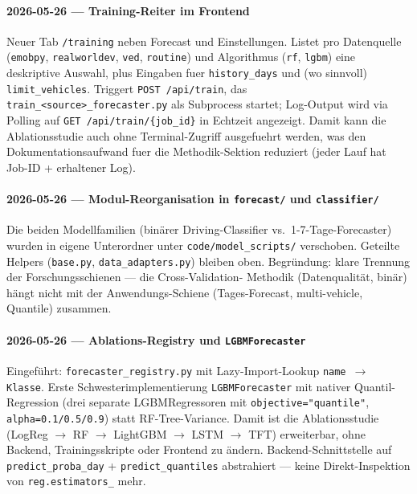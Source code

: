 \paragraph{2026-05-26 --- Training-Reiter im Frontend}
Neuer Tab \texttt{/training} neben Forecast und Einstellungen. Listet pro
Datenquelle (\texttt{emobpy}, \texttt{realworldev}, \texttt{ved},
\texttt{routine}) und Algorithmus (\texttt{rf}, \texttt{lgbm}) eine
deskriptive Auswahl, plus Eingaben fuer \texttt{history\_days} und (wo
sinnvoll) \texttt{limit\_vehicles}. Triggert \texttt{POST /api/train}, das
\texttt{train\_<source>\_forecaster.py} als Subprocess startet; Log-Output
wird via Polling auf \texttt{GET /api/train/\{job\_id\}} in Echtzeit
angezeigt. Damit kann die Ablationsstudie auch ohne Terminal-Zugriff
ausgefuehrt werden, was den Dokumentationsaufwand fuer die Methodik-Sektion
reduziert (jeder Lauf hat Job-ID + erhaltener Log).

\paragraph{2026-05-26 --- Modul-Reorganisation in \texttt{forecast/} und \texttt{classifier/}}
Die beiden Modellfamilien (binärer Driving-Classifier vs.\ 1-7-Tage-Forecaster)
wurden in eigene Unterordner unter \texttt{code/model\_scripts/} verschoben.
Geteilte Helpers (\texttt{base.py}, \texttt{data\_adapters.py}) bleiben oben.
Begründung: klare Trennung der Forschungsschienen --- die Cross-Validation-
Methodik (Datenqualität, binär) hängt nicht mit der Anwendungs-Schiene
(Tages-Forecast, multi-vehicle, Quantile) zusammen.

\paragraph{2026-05-26 --- Ablations-Registry und \texttt{LGBMForecaster}}
Eingeführt: \texttt{forecaster\_registry.py} mit Lazy-Import-Lookup
\texttt{name $\to$ Klasse}. Erste Schwesterimplementierung
\texttt{LGBMForecaster} mit nativer Quantil-Regression (drei separate
LGBMRegressoren mit \texttt{objective="quantile"}, \texttt{alpha=0.1/0.5/0.9})
statt RF-Tree-Variance. Damit ist die Ablationsstudie
(LogReg $\to$ RF $\to$ LightGBM $\to$ LSTM $\to$ TFT) erweiterbar, ohne
Backend, Trainingsskripte oder Frontend zu ändern. Backend-Schnittstelle
auf \texttt{predict\_proba\_day} + \texttt{predict\_quantiles} abstrahiert
--- keine Direkt-Inspektion von \texttt{reg.estimators\_} mehr.

